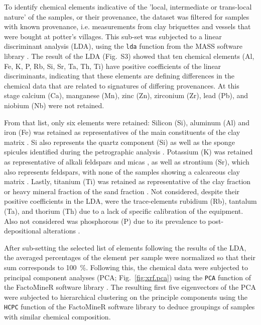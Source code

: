\documentclass[preprint,10pt,oneside,onecolumn,authoryear]{elsarticle}
\begin{document}
To identify chemical elements indicative of the 'local, intermediate or trans-local nature' of the samples, or their provenance, the dataset was filtered for samples with known provenance, i.e. measurements from clay briquettes and vessels that were bought at potter's villages. This sub-set was subjected to a linear discriminant analysis (LDA), using the \verb|lda| function from the MASS software library \citep[v7.3-60.0.1]{Venables.2002}. The result of the LDA (Fig.~S3) showed that ten chemical elements (Al, Fe, K, P, Rb, Si, Sr, Ta, Th, Ti) have positive coefficients of the linear discriminants, indicating that these elements are defining differences in the chemical data that are related to signatures of differing provenances. At this stage calcium (Ca), manganese (Mn), zinc (Zn), zirconium (Zr), lead (Pb), and niobium (Nb) were not retained.

From that list, only six elements were retained: Silicon (Si), aluminum (Al) and iron (Fe) was retained as representatives of the main constituents of the clay matrix \citep[332]{Quinn.2022}. Si also represents the quartz component (Si) \citep[44]{MacKenzie.2017} as well as the sponge spicules identified during the petrographic analysis \citep[1518]{Lukowiak.2022}. Potassium (K) was retained as representative of alkali feldspars and micas \citep[50]{MacKenzie.2017}, as well as strontium (Sr), which also represents feldspars, with none of the samples showing a calcareous clay matrix \citep[387]{Quinn.2022}. Lastly, titanium (Ti) was retained as representative of the clay fraction or heavy mineral fraction of the sand fraction \citep[387]{Quinn.2022}. Not considered, despite their positive coefficients in the LDA, were the trace-elements rubidium (Rb), tantalum (Ta), and thorium (Th) due to a lack of specific calibration of the equipment. Also not considered was phosphorous (P) due to its prevalence to post-depositional alterations \citep[356]{Quinn.2022}.

After sub-setting the selected list of elements following the results of the LDA, the averaged percentages of the element per sample were normalized so that their sum corresponds to 100~\%. Following this, the chemical data were subjected to principal component analyses (PCA; Fig.~\ref{fig:xrf.pca}) using the \verb|PCA| function of the FactoMineR software library \citep[v2.10]{Le.2008}. The resulting first five eigenvectors of the PCA were subjected to hierarchical clustering on the principle components using the \verb|HCPC| function of the FactoMineR software library to deduce groupings of samples with similar chemical composition.
\end{document}
